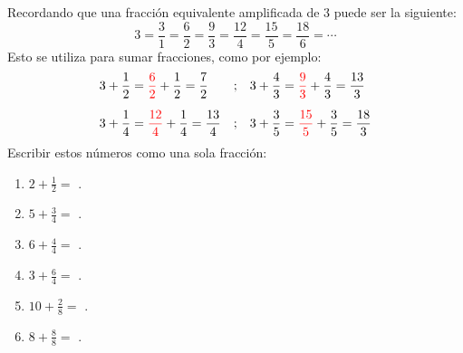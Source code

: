 \documentclass[12pt]{examdesign}
\theoremstyle{plain}
\theoremstyle{definition}
\theoremstyle{remark}
\begin{document}
\begin{fillin}[title={Completamos los espacios vacíos:}, resetcounter=no]
        \begin{question}
        	Recordando que una fracción equivalente amplificada de 3 puede ser la siguiente:
        	\begin{equation*}
        		3=\frac{3}{1}=\frac{6}{2}=\frac{9}{3}=\frac{12}{4}=\frac{15}{5}=\frac{18}{6}=\cdots
        	\end{equation*}
        	Esto se utiliza para sumar fracciones, como por ejemplo:
        	\begin{align*}
        	    3+\frac{1}{2}&=\textcolor{red}{\frac{6}{2}}+\frac{1}{2}=\frac{7}{2}&;&&3+\frac{4}{3}&=\textcolor{red}{\frac{9}{3}}+\frac{4}{3}=\frac{13}{3}\\[0.2cm]
        	    3+\frac{1}{4}&=\textcolor{red}{\frac{12}{4}}+\frac{1}{4}=\frac{13}{4}&;&&3+\frac{3}{5}&=\textcolor{red}{\frac{15}{5}}+\frac{3}{5}=\frac{18}{3}
            \end{align*}
        	Escribir estos números como una sola fracción:
        	\begin{enumerate}
        		\item $2+\frac{1}{2}=$ .
        		\item $5+\frac{3}{4}=$ .
        		\item $6+\frac{4}{4}=$ .
        		\item $3+\frac{6}{4}=$ .
        		\item $10+\frac{2}{8}=$ .
        		\item $8+\frac{8}{8}=$ .
        	\end{enumerate}
        \end{question}
	\end{fillin}
\end{document}

